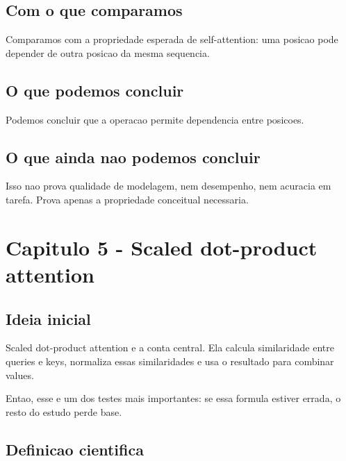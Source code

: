 \subsection{Com o que comparamos}




Comparamos com a propriedade esperada de self-attention: uma posicao pode depender de outra posicao da mesma sequencia.



\subsection{O que podemos concluir}



Podemos concluir que a operacao permite dependencia entre posicoes.



\subsection{O que ainda nao podemos concluir}




Isso nao prova qualidade de modelagem, nem desempenho, nem acuracia em tarefa. Prova apenas a propriedade conceitual necessaria.



\section{Capitulo 5 - Scaled dot-product attention}



\subsection{Ideia inicial}





Scaled dot-product attention e a conta central. Ela calcula similaridade entre queries e keys, normaliza essas similaridades e usa o resultado para combinar values.




Entao, esse e um dos testes mais importantes: se essa formula estiver errada, o resto do estudo perde base.



\subsection{Definicao cientifica}



